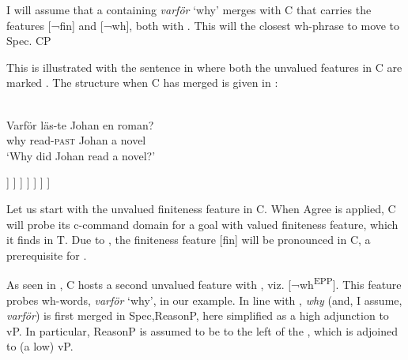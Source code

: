 \documentclass[output=paper]{LSP/langsci}
\begin{document}
  I will assume that a  containing \textit{varför} `why' merges with C that carries the features [¬fin] and [¬wh], both with . This will  the closest wh-phrase to move to Spec. CP

This is illustrated with the  sentence in  where both the unvalued features in C are marked . The structure when C has merged is given in :

\noindent\parbox{\textwidth}{\ea%
    \label{ex:platzack:15}
	  \\
\gll   Varför  läs-te      Johan   en roman?\\
    why    read-\textsc{past}  Johan    a  novel\\
   \glt ‘Why did Johan read a novel?’
\z}

\ea%

    \label{ex:platzack:16}
\begin{forest}
 [CP\is{complementizer}, for tree={align=center, base=top, parent anchor=south, child anchor=north}
    [varför\\{[}wh{]}] [C'
      [C\\{[}¬fin\textsuperscript{EPP}{]}\\{[}¬wh\textsuperscript{EPP}{]}] [\isi{TP}
	[DP\\Johan\\{[}ϕ{]}] [T'
	   [T\\{[}fin{]}] [vP
	      [\st{varför}] [vP
		  [DP\\\st{Johan}\\{[}ϕ{]}] [v'
		     [v\\läste\\{[}fin{]}] [DP\\en roman\\{[}ϕ{]}]
		    ]
		]
	    ]
	  ]
      ]
    ]
 ]
\end{forest}
\z

Let us start with the unvalued finiteness feature in C. When Agree is applied, C will probe its c-command domain for a goal with valued finiteness feature, which it finds in T. Due to , the finiteness feature [fin] will be pronounced in C, a prerequisite for .

As seen in , C hosts a second unvalued feature with , viz. [¬wh\textsuperscript{EPP}].\textsuperscript{} This feature probes wh-words, \textit{varför}  ‘why’, in our example. In line with \citet[667]{ShlonskySoare2011}, \textit{why}  (and, I assume,  \textit{varför}) is first merged in Spec,ReasonP, here simplified as a high adjunction to vP. In particular, ReasonP is assumed to be to the left of the , which is adjoined to (a low) vP.
\end{document}
